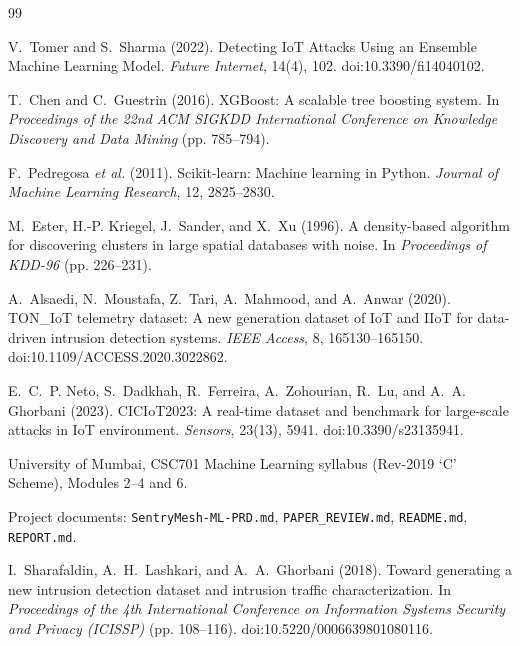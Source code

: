 \documentclass[12pt,a4paper]{article}
\begin{document}
\clearpage
\begin{thebibliography}{99}
\renewcommand{\refname}{References}

 V.~Tomer and S.~Sharma (2022). Detecting IoT Attacks Using an Ensemble Machine Learning Model. \textit{Future Internet}, 14(4), 102. doi:10.3390/fi14040102.

 T.~Chen and C.~Guestrin (2016). XGBoost: A scalable tree boosting system. In \textit{Proceedings of the 22nd ACM SIGKDD International Conference on Knowledge Discovery and Data Mining} (pp. 785--794).

 F.~Pedregosa \textit{et al.} (2011). Scikit-learn: Machine learning in Python. \textit{Journal of Machine Learning Research}, 12, 2825--2830.

 M.~Ester, H.-P. Kriegel, J.~Sander, and X.~Xu (1996). A density-based algorithm for discovering clusters in large spatial databases with noise. In \textit{Proceedings of KDD-96} (pp. 226--231).

 A.~Alsaedi, N.~Moustafa, Z.~Tari, A.~Mahmood, and A.~Anwar (2020). TON\_IoT telemetry dataset: A new generation dataset of IoT and IIoT for data-driven intrusion detection systems. \textit{IEEE Access}, 8, 165130--165150. doi:10.1109/ACCESS.2020.3022862.

 E.~C.~P. Neto, S.~Dadkhah, R.~Ferreira, A.~Zohourian, R.~Lu, and A.~A. Ghorbani (2023). CICIoT2023: A real-time dataset and benchmark for large-scale attacks in IoT environment. \textit{Sensors}, 23(13), 5941. doi:10.3390/s23135941.

 University of Mumbai, CSC701 Machine Learning syllabus (Rev-2019 `C' Scheme), Modules 2--4 and 6.

 Project documents: \texttt{SentryMesh-ML-PRD.md}, \texttt{PAPER\_REVIEW.md}, \texttt{README.md}, \texttt{REPORT.md}.

 I.~Sharafaldin, A.~H.~Lashkari, and A.~A.~Ghorbani (2018). Toward generating a new intrusion detection dataset and intrusion traffic characterization. In \textit{Proceedings of the 4th International Conference on Information Systems Security and Privacy (ICISSP)} (pp. 108--116). doi:10.5220/0006639801080116.

\end{thebibliography}
\end{document}
